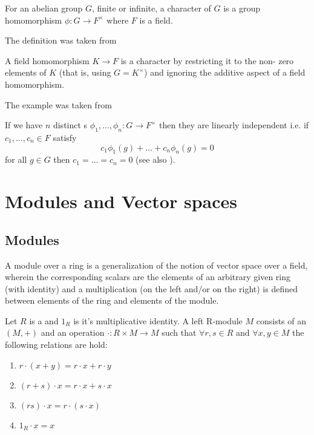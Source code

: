\begin{appendices}
\begin{definition}[Character]
  For an abelian group $G$, finite or infinite, a character of $G$ is
  a group homomorphism $\phi: G \to F^\times$ where $F$ is a field.

  The definition was taken from \cite{bib:KeithConradLinearchar}
  \label{def:character}
\end{definition}

\begin{example}[Character]
  A field homomorphism $K \to F$ is a character by restricting it to the
  non- zero elements of $K$ (that is, using $G = K^\times$) and ignoring the
  additive aspect of a field homomorphism.  

  The example was taken from \cite{bib:KeithConradLinearchar}
  \label{ex:character}
\end{example}

\begin{theorem}[Dedekind]
  If we have $n$ distinct s $\phi_1, \dots,
  \phi_n: G \to F^\times$ then they are linearly independent i.e. if
  $c_1, \dots, c_n \in F$ satisfy
  \[
  c_1 \phi_1(g) + \dots + c_n \phi_n(g) = 0
  \]
  for all $g \in G$ then $c_1 = \dots = c_n = 0$
  (see also \cite{bib:KeithConradLinearchar}).
  \label{thm:dedekind}
\end{theorem}

\section{Modules and Vector spaces}

\subsection{Modules}

A module over a ring is a generalization of the notion of vector space
over a field, wherein the corresponding scalars are the elements of an
arbitrary given ring (with identity) and a multiplication (on the left
and/or on the right) is defined between elements of the ring and
elements of the module.

\begin{definition}[Module]
  Let $R$ is a  and $1_R$ is it's multiplicative
  identity. A left R-module $M$ consists of an 
  $\left(M, +\right)$ and an operation $\cdot: R \times M \to M$ such
  that $\forall r,s \in R$ and $\forall x,y \in M$ the following
  relations are hold:
  \begin{enumerate}
  \item $r \cdot \left(x+y\right) = r \cdot x + r \cdot y$
  \item $\left(r + s \right) \cdot x = r \cdot x + s \cdot x$
  \item $\left(rs\right) \cdot x = r \cdot \left(s \cdot x\right)$
  \item $1_R \cdot x = x$
  \end{enumerate}
  \label{def:module}
\end{definition}


\end{appendices}

